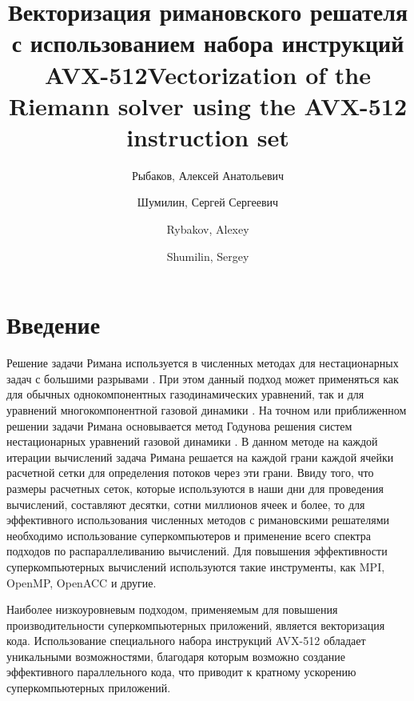\documentclass[utf8]{psta}
\title[векторизация римановского решателя]{Векторизация римановского решателя с использованием набора инструкций AVX-512}
\author{Рыбаков, Алексей Анатольевич}
\author{Шумилин, Сергей Сергеевич}
\title[vectorization of the Riemann solver]{Vectorization of the Riemann solver using the AVX-512 instruction set}
\author{Rybakov, Alexey}
\author{Shumilin, Sergey}
\begin{document}
           
\maketitle   

\section*{Введение}

Решение задачи Римана используется в численных методах для нестационарных задач с большими разрывами \cite{KulPogSemRiemann}.
При этом данный подход может применяться как для обычных однокомпонентных газодинамических уравнений, так и для уравнений многокомпонентной газовой динамики \cite{BorRykRiemann}.
На точном или приближенном решении задачи Римана основывается метод Годунова решения систем нестационарных уравнений газовой динамики \cite{Godunov}.
В данном методе на каждой итерации вычислений задача Римана решается на каждой грани каждой ячейки расчетной сетки для определения потоков через эти грани.
Ввиду того, что размеры расчетных сеток, которые используются в наши дни для проведения вычислений, составляют десятки, сотни миллионов ячеек и более, то для эффективного использования численных методов с римановскими решателями необходимо использование суперкомпьютеров и применение всего спектра подходов по распараллеливанию вычислений.
Для повышения эффективности суперкомпьютерных вычислений используются такие инструменты, как MPI, OpenMP, OpenACC и другие.

Наиболее низкоуровневым подходом, применяемым для повышения производительности суперкомпьютерных приложений, является векторизация кода.
Использование специального набора инструкций AVX-512 обладает уникальными возможностями, благодаря которым возможно создание эффективного параллельного кода, что приводит к кратному ускорению суперкомпьютерных приложений.
\end{document}
